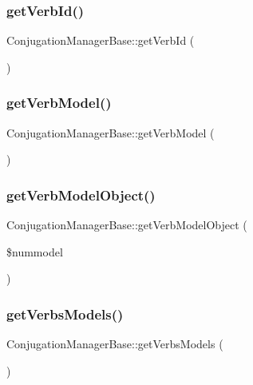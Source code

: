 \subsubsection{\texorpdfstring{get\+Verb\+Id()}{getVerbId()}}
{\footnotesize\ttfamily Conjugation\+Manager\+Base\+::get\+Verb\+Id (\begin{DoxyParamCaption}{ }\end{DoxyParamCaption})}

\hypertarget{class_conjugation_manager_base_aecf22ced680433bb1c366d0de3931bac}{}\label{class_conjugation_manager_base_aecf22ced680433bb1c366d0de3931bac} 
\subsubsection{\texorpdfstring{get\+Verb\+Model()}{getVerbModel()}}
{\footnotesize\ttfamily Conjugation\+Manager\+Base\+::get\+Verb\+Model (\begin{DoxyParamCaption}{ }\end{DoxyParamCaption})}

\hypertarget{class_conjugation_manager_base_a7169d09d7207a9ca1ad4cda9a319effd}{}\label{class_conjugation_manager_base_a7169d09d7207a9ca1ad4cda9a319effd} 
\subsubsection{\texorpdfstring{get\+Verb\+Model\+Object()}{getVerbModelObject()}}
{\footnotesize\ttfamily Conjugation\+Manager\+Base\+::get\+Verb\+Model\+Object (\begin{DoxyParamCaption}\item[{}]{\$nummodel }\end{DoxyParamCaption})}

\hypertarget{class_conjugation_manager_base_ac7e4846ef7b60545bb2b4d77f6bf7f0f}{}\label{class_conjugation_manager_base_ac7e4846ef7b60545bb2b4d77f6bf7f0f} 
\subsubsection{\texorpdfstring{get\+Verbs\+Models()}{getVerbsModels()}}
{\footnotesize\ttfamily Conjugation\+Manager\+Base\+::get\+Verbs\+Models (\begin{DoxyParamCaption}{ }\end{DoxyParamCaption})}

